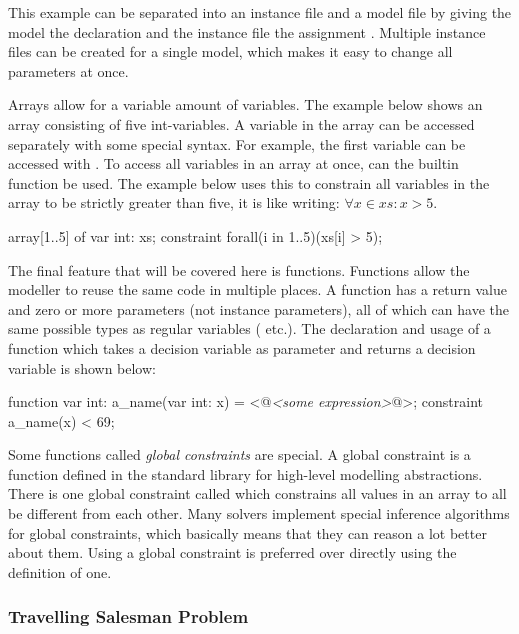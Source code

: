 \documentclass[a4paper,12pt]{article}
\newcommand{\mi}[1]{\mbox{\mzninline{#1}}}
\begin{document}
This example can be separated into an instance file and a model file by giving
the model the declaration {\mi{int: n}} and the
instance file the assignment \mi{n = 5}. Multiple instance files can be created
for a single model, which makes it easy to change all parameters at once.

Arrays allow for a variable amount of variables. The example below shows an array \mi{xs}
consisting of five int-variables. A variable in the array can be accessed separately with
some special syntax. For example, the first variable can be accessed with
\mi{xs[1]}.
To access all variables in an array at once, can the builtin function \mi{forall} be used.
The example below uses this to constrain all variables in the array to be strictly greater
than five, it is like writing: $\forall x \in xs : x > 5$.
\begin{mznnobreak}
array[1..5] of var int: xs;
constraint forall(i in 1..5)(xs[i] > 5);
\end{mznnobreak}

The final feature that will be covered here is functions. Functions allow the modeller to
reuse the same code in multiple places. A function has a return value and zero or more
parameters (not instance parameters), all of which can have the same possible types as
regular variables (\mi{int} etc.). The declaration and usage of a function which takes a decision variable as
parameter and returns a decision variable is shown below:
\begin{mznnobreak}
function var int: a_name(var int: x) = <@\textit{<some expression>}@>;
constraint a_name(x) < 69;
\end{mznnobreak}

Some functions called \emph{global constraints} are special. A global constraint is a
function defined in the standard library for high-level modelling abstractions. There is
one global constraint called \mi{all_different} which constrains all values in an array to
all be different from each other. Many solvers implement special inference algorithms for
global constraints, which basically means that they can reason a lot better about them.
Using a global constraint is preferred over directly using the definition of one.

\subsubsection{Travelling Salesman Problem}\label{sec:tsp}
\end{document}
